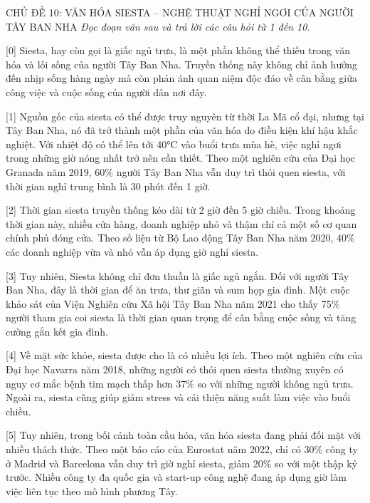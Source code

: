 \documentclass[12pt,a4paper,twoside]{article}
\newenvironment{readingpassage}[1][]{%
    \begin{tcolorbox}[enhanced, colback=grayLight, colframe=secondaryBlue,
        coltitle=textDark, fonttitle=\bfseries, title={#1},
        rounded corners, arc=3mm, boxrule=1pt,
        left=15pt, right=15pt, top=10pt, bottom=10pt,
        breakable, before skip=10pt, after skip=10pt, drop fuzzy shadow]
    \setstretch{1.3}
}{\end{tcolorbox}}
\begin{document}
\newpage
\label{a_cd10}
\begin{topicbox}{\large CHỦ ĐỀ 10: VĂN HÓA SIESTA -- NGHỆ THUẬT NGHỈ NGƠI CỦA NGƯỜI TÂY BAN NHA}
\vspace{8pt}
\textit{Đọc đoạn văn sau và trả lời các câu hỏi từ 1 đến 10.}
\vspace{6pt}
\end{topicbox}
\vspace{5pt}
\begin{readingpassage}[]
[0] Siesta, hay còn gọi là giấc ngủ trưa, là một phần không thể thiếu trong văn hóa và lối sống của người Tây Ban Nha. Truyền thống này không chỉ ảnh hưởng đến nhịp sống hàng ngày mà còn phản ánh quan niệm độc đáo về cân bằng giữa công việc và cuộc sống của người dân nơi đây.

[1] Nguồn gốc của siesta có thể được truy nguyên từ thời La Mã cổ đại, nhưng tại Tây Ban Nha, nó đã trở thành một phần của văn hóa do điều kiện khí hậu khắc nghiệt. Với nhiệt độ có thể lên tới 40°C vào buổi trưa mùa hè, việc nghỉ ngơi trong những giờ nóng nhất trở nên cần thiết. Theo một nghiên cứu của Đại học Granada năm 2019, 60\% người Tây Ban Nha vẫn duy trì thói quen siesta, với thời gian nghỉ trung bình là 30 phút đến 1 giờ.

[2] Thời gian siesta truyền thống kéo dài từ 2 giờ đến 5 giờ chiều. Trong khoảng thời gian này, nhiều cửa hàng, doanh nghiệp nhỏ và thậm chí cả một số cơ quan chính phủ đóng cửa. Theo số liệu từ Bộ Lao động Tây Ban Nha năm 2020, 40\% các doanh nghiệp vừa và nhỏ vẫn áp dụng giờ nghỉ siesta.

[3] Tuy nhiên, Siesta không chỉ đơn thuần là giấc ngủ ngắn. Đối với người Tây Ban Nha, đây là thời gian để ăn trưa, thư giãn và sum họp gia đình. Một cuộc khảo sát của Viện Nghiên cứu Xã hội Tây Ban Nha năm 2021 cho thấy 75\% người tham gia coi siesta là thời gian quan trọng để cân bằng cuộc sống và tăng cường gắn kết gia đình.

[4] Về mặt sức khỏe, siesta được cho là có nhiều lợi ích. Theo một nghiên cứu của Đại học Navarra năm 2018, những người có thói quen siesta thường xuyên có nguy cơ mắc bệnh tim mạch thấp hơn 37\% so với những người không ngủ trưa. Ngoài ra, siesta cũng giúp giảm stress và cải thiện năng suất làm việc vào buổi chiều.

[5] Tuy nhiên, trong bối cảnh toàn cầu hóa, văn hóa siesta đang phải đối mặt với nhiều thách thức. Theo một báo cáo của Eurostat năm 2022, chỉ có 30\% công ty ở Madrid và Barcelona vẫn duy trì giờ nghỉ siesta, giảm 20\% so với một thập kỷ trước. Nhiều công ty đa quốc gia và start-up công nghệ đang áp dụng giờ làm việc liên tục theo mô hình phương Tây.


\end{readingpassage}
\end{document}
